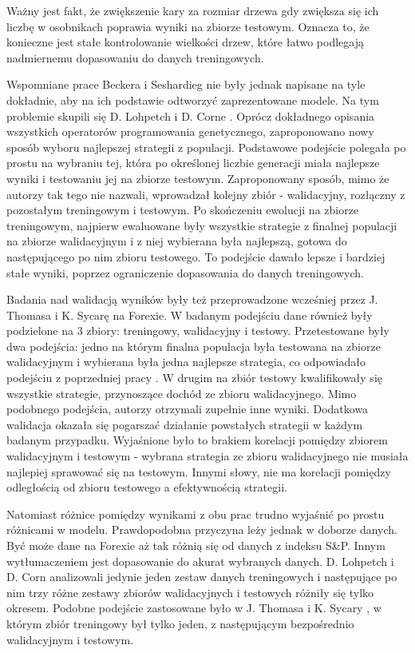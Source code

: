 \documentclass[twoside]{iisthesis}
\begin{document}
Ważny jest fakt, że zwiększenie kary za rozmiar drzewa gdy zwiększa się ich liczbę w osobnikach poprawia wyniki na zbiorze testowym. Oznacza to, że konieczne jest stałe kontrolowanie wielkości drzew, które łatwo podlegają nadmiernemu dopasowaniu do danych treningowych.

Wspomniane prace Beckera i Seshardieg nie były jednak napisane na tyle dokładnie, aby na ich podstawie odtworzyć zaprezentowane modele. Na tym problemie skupili się D. Lohpetch i D. Corne \cite{5393324}. Oprócz dokładnego opisania wszystkich operatorów programowania genetycznego, zaproponowano nowy sposób wyboru najlepszej strategii z populacji. Podstawowe podejście polegała po prostu na wybraniu tej, która po określonej liczbie generacji miała najlepsze wyniki i testowaniu jej na zbiorze testowym. Zaproponowany sposób, mimo że autorzy tak tego nie nazwali, wprowadzał kolejny zbiór - walidacyjny, rozłączny z pozostałym treningowym i testowym. Po skończeniu ewolucji na zbiorze treningowym, najpierw ewaluowane były wszystkie strategie z finalnej populacji na zbiorze walidacyjnym i z niej wybierana była najlepszą, gotowa do następującego po nim zbioru testowego. To podejście dawało lepsze i bardziej stałe wyniki, poprzez ograniczenie dopasowania do danych treningowych.

Badania nad walidacją wyników były też przeprowadzone wcześniej przez J. Thomasa i K. Sycarę \cite{Thomas1999TheIO} na Forexie.  W badanym podejściu dane również były podzielone na 3 zbiory: treningowy, walidacyjny i testowy. Przetestowane były dwa podejścia: jedno na którym finalna populacja była testowana na zbiorze walidacyjnym i wybierana była jedna najlepsze strategia, co odpowiadało podejściu z poprzedniej pracy \cite{5393324}. W drugim na zbiór testowy kwalifikowały się wszystkie strategie, przynoszące dochód ze zbioru walidacyjnego. Mimo podobnego podejścia, autorzy otrzymali zupełnie inne wyniki. Dodatkowa walidacja okazała się pogarszać działanie powstałych strategii w każdym badanym przypadku. Wyjaśnione było to brakiem korelacji pomiędzy zbiorem walidacyjnym i testowym - wybrana strategia ze zbioru walidacyjnego nie musiała najlepiej sprawować się na testowym. Innymi słowy, nie ma korelacji pomiędzy odległością od zbioru testowego a efektywnością strategii.

Natomiast różnice pomiędzy wynikami z obu prac trudno wyjaśnić po prostu różnicami w modelu. Prawdopodobna przyczyna leży jednak w doborze danych. Być może dane na Forexie aż tak różnią się od danych z indeksu S\&P. Innym wytłumaczeniem jest dopasowanie do akurat wybranych danych. D. Lohpetch i D. Corn \cite{5393324} analizowali jedynie jeden zestaw danych treningowych i następujące po nim trzy różne zestawy zbiorów walidacyjnych i testowych różniły się tylko okresem. Podobne podejście zastosowane było w J. Thomasa i K. Sycary \cite{Thomas1999TheIO}, w którym zbiór treningowy był tylko jeden, z następującym bezpośrednio walidacyjnym i testowym.
\end{document}

